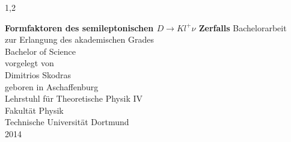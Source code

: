 \documentclass[11pt,a4paper,twoside]{report}
\begin{document}
\begin{spacing}{1,2}

%
%


\newcommand{\thetitle}{Formfaktoren des semileptonischen $D \rightarrow  K l^+ \nu$ Zerfalls}

\thispagestyle{empty}
\begin{center}

\Huge\textbf{\thetitle}
\vfill
\vfill
\Large
Bachelorarbeit \\ zur Erlangung des akademischen Grades \\ Bachelor of Science \\
\vspace{20pt}
\normalsize
vorgelegt von \\[5pt]
{\Large Dimitrios Skodras} \\[5pt]
geboren in Aschaffenburg \\
\vspace{20pt}
Lehrstuhl für Theoretische Physik IV \\ Fakultät Physik \\
Technische Universität Dortmund \\ 2014
\end{center}
\newpage
\thispagestyle{empty}
\newpage
\cleardoublepage


\end{spacing}
\end{document}
